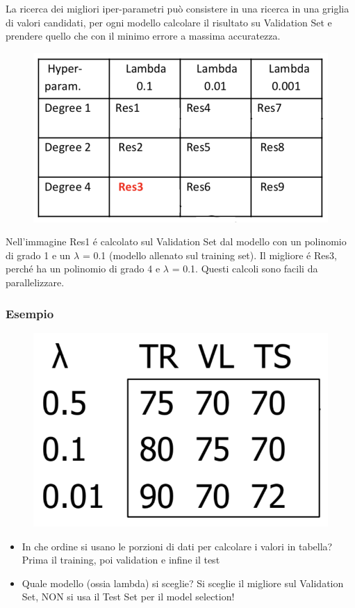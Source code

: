 \documentclass{article}
\begin{document}
La ricerca dei migliori iper-parametri può consistere in una ricerca in una griglia di valori candidati, per ogni modello calcolare il risultato su Validation Set e prendere quello che con il minimo errore a massima accuratezza. 
\begin{figure}[H]
\centering
\includegraphics[scale=0.5]{Images/hypergrid.png}
\end{figure}
Nell'immagine Res1 é calcolato sul Validation Set dal modello con un polinomio di grado 1 e un $\lambda$ = 0.1 (modello allenato sul training set). Il migliore é Res3, perché ha un polinomio di grado 4 e $\lambda$ = 0.1. Questi calcoli sono facili da parallelizzare.

\subsubsection{Esempio}
\begin{figure}[H]
\centering
\includegraphics[scale=0.5]{Images/trvltsexample.png}
\end{figure}
\begin{itemize}
    \item In che ordine si usano le porzioni di dati per calcolare i valori in tabella? \newline
    Prima il training, poi validation e infine il test
    \item Quale modello (ossia lambda) si sceglie? \newline 
    Si sceglie il migliore sul Validation Set, NON si usa il Test Set per il model selection!
\end{itemize}
\end{document}
